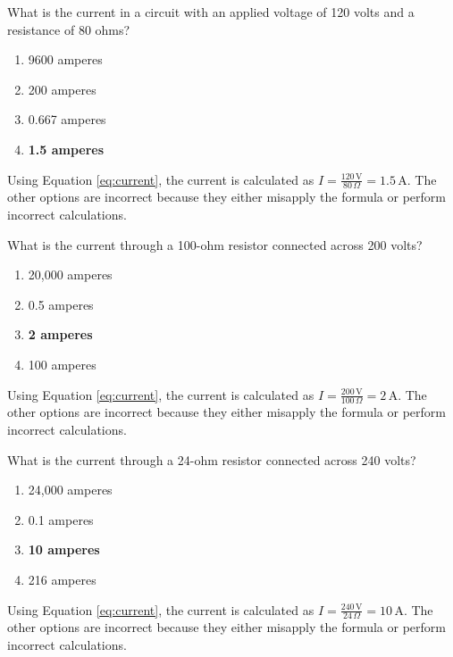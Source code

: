 \begin{tcolorbox}[colback=gray!10!white,colframe=black!75!black,title={T5D07}]
    What is the current in a circuit with an applied voltage of 120 volts and a resistance of 80 ohms?
    \begin{enumerate}[label=\Alph*),noitemsep]
        \item 9600 amperes
        \item 200 amperes
        \item 0.667 amperes
        \item \textbf{1.5 amperes}
    \end{enumerate}
\end{tcolorbox}
Using Equation \ref{eq:current}, the current is calculated as \(I = \frac{120\,\text{V}}{80\,\Omega} = 1.5\,\text{A}\). The other options are incorrect because they either misapply the formula or perform incorrect calculations.

\begin{tcolorbox}[colback=gray!10!white,colframe=black!75!black,title={T5D08}]
    What is the current through a 100-ohm resistor connected across 200 volts?
    \begin{enumerate}[label=\Alph*),noitemsep]
        \item 20,000 amperes
        \item 0.5 amperes
        \item \textbf{2 amperes}
        \item 100 amperes
    \end{enumerate}
\end{tcolorbox}
Using Equation \ref{eq:current}, the current is calculated as \(I = \frac{200\,\text{V}}{100\,\Omega} = 2\,\text{A}\). The other options are incorrect because they either misapply the formula or perform incorrect calculations.

\begin{tcolorbox}[colback=gray!10!white,colframe=black!75!black,title={T5D09}]
    What is the current through a 24-ohm resistor connected across 240 volts?
    \begin{enumerate}[label=\Alph*),noitemsep]
        \item 24,000 amperes
        \item 0.1 amperes
        \item \textbf{10 amperes}
        \item 216 amperes
    \end{enumerate}
\end{tcolorbox}
Using Equation \ref{eq:current}, the current is calculated as \(I = \frac{240\,\text{V}}{24\,\Omega} = 10\,\text{A}\). The other options are incorrect because they either misapply the formula or perform incorrect calculations.

